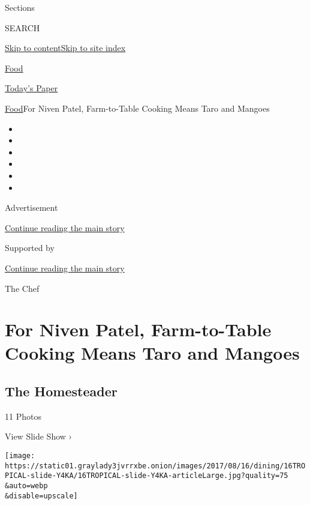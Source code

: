 Sections

SEARCH

\protect\hyperlink{site-content}{Skip to
content}\protect\hyperlink{site-index}{Skip to site index}

\href{https://www.nytimes3xbfgragh.onion/section/food}{Food}

\href{https://myaccount.nytimes3xbfgragh.onion/auth/login?response_type=cookie\&client_id=vi}{}

\href{https://www.nytimes3xbfgragh.onion/section/todayspaper}{Today's
Paper}

\href{/section/food}{Food}\textbar{}For Niven Patel, Farm-to-Table
Cooking Means Taro and Mangoes

\begin{itemize}
\item
\item
\item
\item
\item
\item
\end{itemize}

Advertisement

\protect\hyperlink{after-top}{Continue reading the main story}

Supported by

\protect\hyperlink{after-sponsor}{Continue reading the main story}

The Chef

\hypertarget{for-niven-patel-farm-to-table-cooking-means-taro-and-mangoes}{%
\section{For Niven Patel, Farm-to-Table Cooking Means Taro and
Mangoes}\label{for-niven-patel-farm-to-table-cooking-means-taro-and-mangoes}}

\href{https://www.nytimes3xbfgragh.onion/slideshow/2017/08/14/dining/the-homesteader.html}{}

\hypertarget{the-homesteader}{%
\subsection{The Homesteader}\label{the-homesteader}}

11 Photos

View Slide Show ›

\texttt{[image: https://static01.graylady3jvrrxbe.onion/images/2017/08/16/dining/16TROPICAL-slide-Y4KA/16TROPICAL-slide-Y4KA-articleLarge.jpg?quality=75\\\&auto=webp\\\&disable=upscale]}

